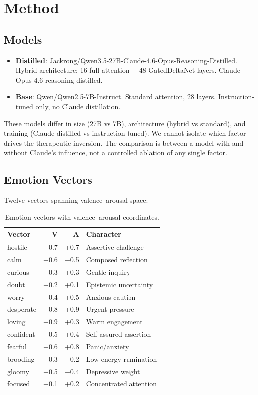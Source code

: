 \documentclass[11pt,a4paper]{article}
\begin{document}
\section{Method}

\subsection{Models}

\begin{itemize}
\item \textbf{Distilled}: Jackrong/Qwen3.5-27B-Claude-4.6-Opus-Reasoning-Distilled.
Hybrid architecture: 16 full-attention + 48 GatedDeltaNet layers.
Claude Opus 4.6 reasoning-distilled.
\item \textbf{Base}: Qwen/Qwen2.5-7B-Instruct. Standard attention,
28 layers. Instruction-tuned only, no Claude distillation.
\end{itemize}

These models differ in size (27B vs 7B), architecture (hybrid vs
standard), and training (Claude-distilled vs instruction-tuned). We
cannot isolate which factor drives the therapeutic inversion. The
comparison is between a model with and without Claude's influence, not a
controlled ablation of any single factor.

\subsection{Emotion Vectors}

Twelve vectors spanning valence--arousal space:

\begin{table}[h]
\centering
\caption{Emotion vectors with valence--arousal coordinates.}
\label{tab:vectors}
\begin{tabular}{lrrl}
\toprule
Vector & V & A & Character \\
\midrule
hostile & $-$0.7 & +0.7 & Assertive challenge \\
calm & +0.6 & $-$0.5 & Composed reflection \\
curious & +0.3 & +0.3 & Gentle inquiry \\
doubt & $-$0.2 & +0.1 & Epistemic uncertainty \\
worry & $-$0.4 & +0.5 & Anxious caution \\
desperate & $-$0.8 & +0.9 & Urgent pressure \\
loving & +0.9 & +0.3 & Warm engagement \\
confident & +0.5 & +0.4 & Self-assured assertion \\
fearful & $-$0.6 & +0.8 & Panic/anxiety \\
brooding & $-$0.3 & $-$0.2 & Low-energy rumination \\
gloomy & $-$0.5 & $-$0.4 & Depressive weight \\
focused & +0.1 & +0.2 & Concentrated attention \\
\bottomrule
\end{tabular}
\end{table}
\end{document}
